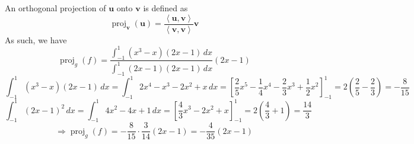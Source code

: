 \documentclass{article}
\theoremstyle{definition}
\newenvironment{solution}[1][]{\begin{replacementsoln}}{\end{replacementsoln}}
\begin{document}
\begin{solution}
  An orthogonal projection of \(\mathbf{u}\) onto \(\mathbf{v}\) is defined as 
  \[
    \operatorname{proj}_{\mathbf{v}} (\mathbf{u}) = \frac{\left\langle \mathbf{u},\mathbf{v} \right\rangle }{\left\langle \mathbf{v},\mathbf{v} \right\rangle }\mathbf{v}
  \]
  As such, we have
  \[
    \operatorname{proj}_{g} (f) = \frac{\int_{-1}^{1}\left( x^3 -x \right)\left( 2x-1 \right)\,dx    }{\int_{-1}^1 \left( 2x-1 \right)\left( 2x-1 \right)\,dx   } \left( 2x-1 \right)
  \]
  \[
    \int_{-1}^1 \left( x^3 -x \right)\left( 2x-1 \right)  \,dx =\int_{-1}^1 2x^4 - x^3- 2x^2 + x\,dx = \left[\frac{2}{5}x^5 - \frac{1}{4}x^4 - \frac{2}{3}x^3 + \frac{1}{2}x^2\right]_{-1}^1=2 \left( \frac{2}{5}-\frac{2}{3} \right) =-\frac{8}{15}
  \]
  \[
    \int_{-1}^1 \left( 2x-1 \right)^2\,dx = \int_{-1}^1 4x^2 - 4x + 1\,dx=\left[ \frac{4}{3}x^3 - 2x^2 + x \right]_{-1}^1 = 2\left( \frac{4}{3}+1 \right) =\frac{14}{3}
  \]
  \[
    \Longrightarrow \operatorname{proj}_g(f)=-\frac{8}{15}\cdot \frac{3}{14}\left( 2x-1 \right)  = -\frac{4}{35}\left( 2x-1 \right) 
  \]
\end{solution}
\end{document}
